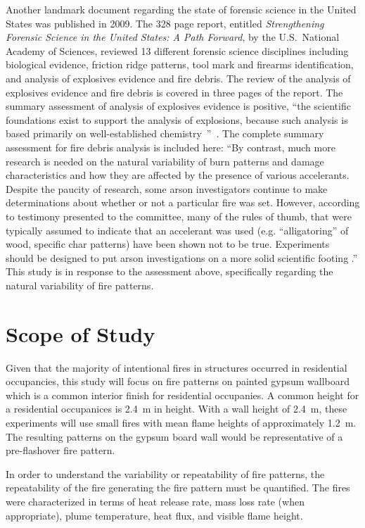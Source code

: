 \documentclass[twoside]{uocthesis}
\begin{document}
Another landmark document regarding the state of forensic science in the United States was published in 2009.  The 328 page report, entitled {\em Strengthening Forensic Science in the United States: A Path Forward}, by the U.S.~National Academy of Sciences, reviewed 13 different forensic science disciplines including biological evidence, friction ridge patterns, tool mark and firearms identification, and analysis of explosives evidence and fire debris.  The review of the analysis of explosives evidence and fire debris is covered in three pages of the report.  The summary assessment of analysis of explosives evidence is positive, ``the scientific foundations exist to support the analysis of explosions, because such analysis is based primarily on well-established chemistry~''~\cite{Forensic:2009}.  The complete summary assessment for fire debris analysis is included here: ``By contrast, much more research is needed on the natural variability of burn patterns and damage characteristics and how they are affected by the presence of various accelerants.  Despite the paucity of research, some arson investigators continue to make determinations about whether or not a particular fire was set.  However, according to testimony presented to the committee, many of the rules of thumb, that were typically assumed to indicate that an accelerant was used (e.g. ``alligatoring'' of wood, specific char patterns) have been shown not to be true.  Experiments should be designed to put arson investigations on a more solid scientific footing .''
This study is in response to the assessment above, specifically regarding the natural variability of fire patterns.


\section{Scope of Study}

Given that the majority of intentional fires in structures occurred in residential occupancies, this study will focus on fire patterns on painted gypsum wallboard which is a common interior finish for residential occupanies.  A common height for a residential occupanices is 2.4~m in height.  With a wall height of 2.4~m, these experiments will use small fires with mean flame heights of approximately 1.2~m.  The resulting patterns on the gypsum board wall would be representative of a pre-flashover fire pattern.

In order to understand the variability or repeatability of fire patterns, the repeatability of the fire generating the fire pattern must be quantified.  The fires were characterized in terms of heat release rate, mass loss rate (when appropriate), plume temperature, heat flux, and visible flame height.
\end{document}
